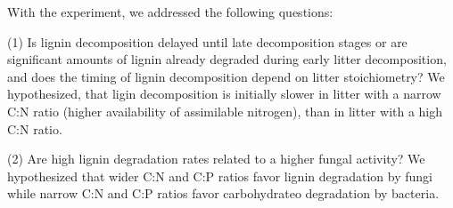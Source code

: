 With the experiment, we addressed the following questions:

(1) Is lignin decomposition delayed until late decomposition stages or are significant amounts of lignin already degraded during early litter decomposition, and does the timing of lignin decomposition depend on litter stoichiometry? We hypothesized, that ligin decomposition is initially slower in litter with a narrow C:N ratio (higher availability of assimilable nitrogen), than in litter with a high C:N ratio.

(2) Are high lignin degradation rates related to a higher fungal activity? We hypothesized that wider C:N and C:P ratios favor lignin degradation by fungi while narrow C:N and C:P ratios favor carbohydrateo degradation by bacteria. 